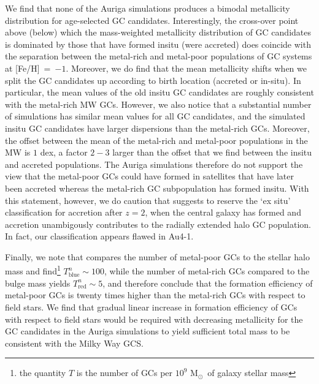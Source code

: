 \documentclass[a4paper,fleqn,usenatbib]{mnras}
\newcommand{\Sun}[0]{\ensuremath{_{\odot}}}
\begin{document}
We find that none of the Auriga simulations produces a bimodal 
metallicity distribution for age-selected GC candidates. Interestingly, the 
cross-over point above (below) which the mass-weighted metallicity distribution
of GC candidates is dominated by those that have formed insitu (were accreted) 
does coincide with the separation between the metal-rich and metal-poor populations 
of GC systems at [Fe/H]~=~$-1$. Moreover, we do find that the mean metallicity
shifts when we split the GC candidates up according to birth location (accreted
or in-situ). In particular, the mean values of the old insitu GC candidates are 
roughly consistent with the metal-rich MW GCs. However, we also notice that a 
substantial number of simulations has similar mean values for all GC candidates, 
and the simulated insitu GC candidates have larger dispersions than the metal-rich 
GCs. Moreover, the offset between the mean of the metal-rich and metal-poor 
populations in the MW is $1$ dex, a factor $2-3$ larger than the offset that we 
find between the insitu and accreted populations. The Auriga simulations therefore
do not support the view that the metal-poor GCs could have formed in satellites
that have later been accreted whereas the metal-rich GC subpopulation has formed
insitu. With this statement, however, we do caution that \citet{2019MNRAS.486.3134K} 
suggests to reserve the `ex situ' classification for accretion after $z=2$, when
the central galaxy has formed and accretion unambigously contributes to the
radially extended halo GC population. In fact, our classification appears flawed
in Au4-1.

Finally, we note that \citet{2006ARA&A..44..193B} compares the number of metal-poor 
GCs to the stellar halo mass and find\footnote{the quantity $T$ is the number of 
GCs per $10^9$ M\Sun \, of galaxy stellar mass} $T^n_{\text{blue}} \sim 100$, 
while the number of metal-rich GCs compared to the bulge mass yields 
$T^n_{\text{red}} \sim 5$, and therefore conclude that the formation efficiency
of metal-poor GCs is twenty times higher than the metal-rich GCs with respect to 
field stars. We find that gradual linear increase in formation efficiency of GCs
with respect to field stars would be required with decreasing metallicity for
the GC candidates in the Auriga simulations to yield sufficient total mass to
be consistent with the Milky Way GCS.
\end{document}
